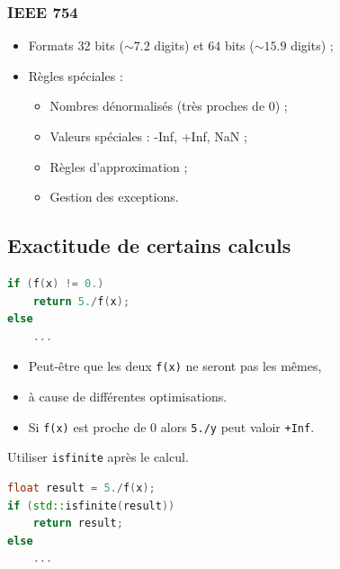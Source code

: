 \documentclass{beamer}
\begin{document}
\begin{frame}
    \frametitle{IEEE 754}

    \begin{itemize}
        \item Formats 32 bits ($\sim 7.2$ digits) et 64 bits ($\sim 15.9$ digits) ;
        \item Règles spéciales :
              \begin{itemize}
                  \item Nombres dénormalisés (très proches de $0$) ;
                  \item Valeurs spéciales : -Inf, +Inf, NaN ;
                  \item Règles d'approximation ;
                  \item Gestion des exceptions.
              \end{itemize}
    \end{itemize}
\end{frame}

\subsection{Exactitude de certains calculs}

\begin{frame}[fragile]
    \begin{lstlisting}[language=c++]
if (f(x) != 0.)
    return 5./f(x);
else
    ...
    \end{lstlisting}

    \begin{itemize}
        \item Peut-être que les deux \verb'f(x)' ne seront pas les mêmes,
        \item à cause de différentes optimisations.
        \item Si \verb'f(x)' est proche de $0$ alors \verb'5./y' peut valoir \verb'+Inf'.
    \end{itemize}
\end{frame}

\begin{frame}[fragile]
    Utiliser \verb'isfinite' après le calcul.

    \begin{lstlisting}[language=c++]
float result = 5./f(x);
if (std::isfinite(result))
    return result;
else
    ...
    \end{lstlisting}
\end{frame}
\end{document}
